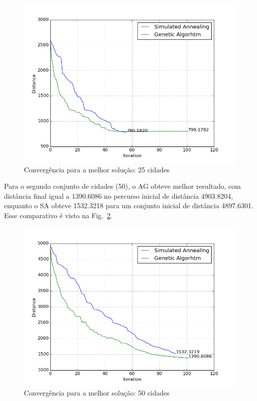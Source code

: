 \documentclass[journal, a4paper]{IEEEtran}
\begin{document}
    \begin{figure}[H]
		\begin{center}
		\includegraphics[width=\columnwidth]{25-comparacao.png}
		\caption{Convergência para a melhor solução: 25 cidades}
		\label{fig:comp-25}
		\end{center}
	\end{figure}

    Para o segundo conjunto de cidades (50), o AG obteve melhor resultado, com distância final igual a 1390.6086 no percurso inicial de distância 4903.8204, enquanto o SA obteve 1532.3218 para um conjunto inicial de distância 4897.6301. Esse comparativo é visto na Fig.~\ref{fig:comp-50}.

    \begin{figure}[H]
		\begin{center}
		\includegraphics[width=\columnwidth]{50-comparacao.png}
		\caption{Convergência para a melhor solução: 50 cidades}
		\label{fig:comp-50}
		\end{center}
	\end{figure}
\end{document}
